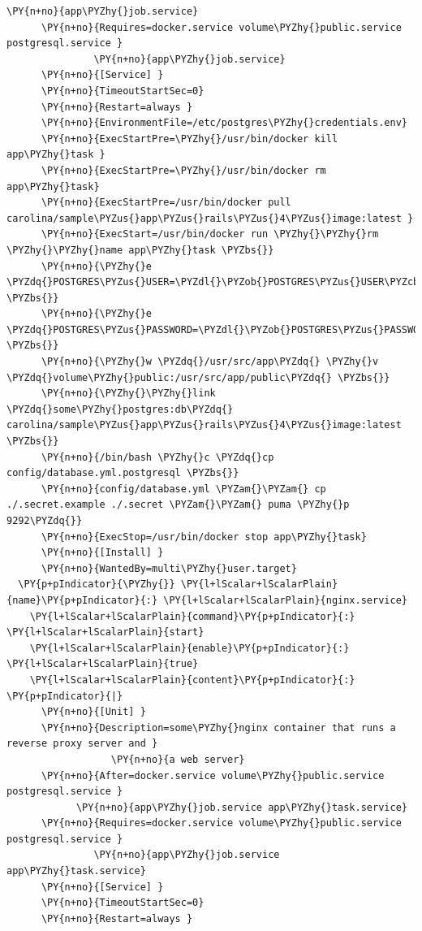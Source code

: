 \begin{codelisting}
\begin{Verbatim}[fontsize=\relsize{-2.5},fontseries=b,commandchars=\\\{\}]
            \PY{n+no}{app\PYZhy{}job.service}
      \PY{n+no}{Requires=docker.service volume\PYZhy{}public.service postgresql.service }
               \PY{n+no}{app\PYZhy{}job.service}
      \PY{n+no}{[Service] }
      \PY{n+no}{TimeoutStartSec=0}
      \PY{n+no}{Restart=always }
      \PY{n+no}{EnvironmentFile=/etc/postgres\PYZhy{}credentials.env}
      \PY{n+no}{ExecStartPre=\PYZhy{}/usr/bin/docker kill app\PYZhy{}task }
      \PY{n+no}{ExecStartPre=\PYZhy{}/usr/bin/docker rm app\PYZhy{}task}
      \PY{n+no}{ExecStartPre=/usr/bin/docker pull carolina/sample\PYZus{}app\PYZus{}rails\PYZus{}4\PYZus{}image:latest }
      \PY{n+no}{ExecStart=/usr/bin/docker run \PYZhy{}\PYZhy{}rm \PYZhy{}\PYZhy{}name app\PYZhy{}task \PYZbs{}}
      \PY{n+no}{\PYZhy{}e \PYZdq{}POSTGRES\PYZus{}USER=\PYZdl{}\PYZob{}POSTGRES\PYZus{}USER\PYZcb{}\PYZdq{} \PYZbs{}}
      \PY{n+no}{\PYZhy{}e \PYZdq{}POSTGRES\PYZus{}PASSWORD=\PYZdl{}\PYZob{}POSTGRES\PYZus{}PASSWORD\PYZcb{}\PYZdq{} \PYZbs{}}
      \PY{n+no}{\PYZhy{}w \PYZdq{}/usr/src/app\PYZdq{} \PYZhy{}v \PYZdq{}volume\PYZhy{}public:/usr/src/app/public\PYZdq{} \PYZbs{}}
      \PY{n+no}{\PYZhy{}\PYZhy{}link \PYZdq{}some\PYZhy{}postgres:db\PYZdq{} carolina/sample\PYZus{}app\PYZus{}rails\PYZus{}4\PYZus{}image:latest \PYZbs{}}
      \PY{n+no}{/bin/bash \PYZhy{}c \PYZdq{}cp config/database.yml.postgresql \PYZbs{}}
      \PY{n+no}{config/database.yml \PYZam{}\PYZam{} cp ./.secret.example ./.secret \PYZam{}\PYZam{} puma \PYZhy{}p 9292\PYZdq{}}
      \PY{n+no}{ExecStop=/usr/bin/docker stop app\PYZhy{}task}
      \PY{n+no}{[Install] }
      \PY{n+no}{WantedBy=multi\PYZhy{}user.target}
  \PY{p+pIndicator}{\PYZhy{}} \PY{l+lScalar+lScalarPlain}{name}\PY{p+pIndicator}{:} \PY{l+lScalar+lScalarPlain}{nginx.service}
    \PY{l+lScalar+lScalarPlain}{command}\PY{p+pIndicator}{:} \PY{l+lScalar+lScalarPlain}{start}
    \PY{l+lScalar+lScalarPlain}{enable}\PY{p+pIndicator}{:} \PY{l+lScalar+lScalarPlain}{true}
    \PY{l+lScalar+lScalarPlain}{content}\PY{p+pIndicator}{:} \PY{p+pIndicator}{|}
      \PY{n+no}{[Unit] }
      \PY{n+no}{Description=some\PYZhy{}nginx container that runs a reverse proxy server and }
                  \PY{n+no}{a web server}
      \PY{n+no}{After=docker.service volume\PYZhy{}public.service postgresql.service }
            \PY{n+no}{app\PYZhy{}job.service app\PYZhy{}task.service}
      \PY{n+no}{Requires=docker.service volume\PYZhy{}public.service postgresql.service }
               \PY{n+no}{app\PYZhy{}job.service app\PYZhy{}task.service}
      \PY{n+no}{[Service] }
      \PY{n+no}{TimeoutStartSec=0}
      \PY{n+no}{Restart=always }

\end{Verbatim}
\end{codelisting}
